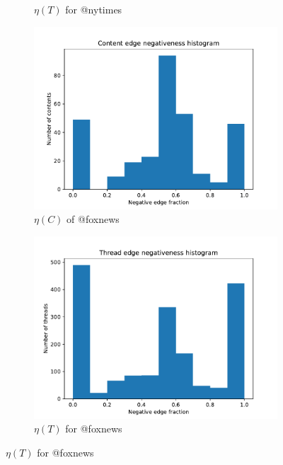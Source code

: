 \begin{figure}
\begin{center}
\begin{subfigure}[b]{0.4\textwidth}
			\caption{$\eta(T)$ for @nytimes}
			\label{fig:nytimes-thread-eta}
		\end{subfigure}
		\begin{subfigure}[b]{0.4\textwidth}
			\centering
			\includegraphics[width=\textwidth]{tex/out/foxnews2000/neg-fraction-content-hist.pdf}
			\caption{$\eta(C)$ of @foxnews}
			\label{fig:foxnews-content-eta}
		\end{subfigure}
		\begin{subfigure}[b]{0.4\textwidth}
			\centering
			\includegraphics[width=\textwidth]{tex/out/foxnews2000/neg-fraction-thread-hist.pdf}
			\caption{$\eta(T)$ for @foxnews}
			\label{fig:foxnews-thread-eta}
		\end{subfigure}

\end{center}
\end{figure}
